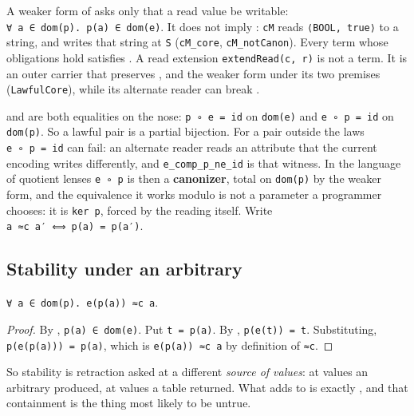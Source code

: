 A weaker form of  asks only that a read value be writable:
\texttt{∀\ a\ ∈\ dom(p).\ p(a)\ ∈\ dom(e)}. It does not imply : \texttt{cM} reads \texttt{⟨BOOL,\ true⟩}
to a string, and writes that string at \texttt{S} (\texttt{cM\_core}, \texttt{cM\_notCanon}). Every term whose obligations hold
satisfies . A read extension \texttt{extendRead(c,\ r)} is not a term. It is an outer carrier that
preserves ,  and the weaker form under its two premises
(\texttt{LawfulCore}), while its alternate reader can break .

 and  are both equalities on the nose: \texttt{p\ ∘\ e\ =\ id} on
\texttt{dom(e)} and \texttt{e\ ∘\ p\ =\ id} on \texttt{dom(p)}. So a lawful pair is a partial bijection. For a pair
outside the laws \texttt{e\ ∘\ p\ =\ id} can fail: an alternate reader reads an attribute that the current
encoding writes differently, and \texttt{e\_comp\_p\_ne\_id} is that witness. In the language of quotient
lenses \cite{quotient-lenses} \texttt{e\ ∘\ p} is then a \textbf{canonizer}, total on \texttt{dom(p)} by the
weaker form, and the equivalence it works modulo is not a parameter a programmer chooses: it is
\texttt{ker\ p}, forced by the reading itself. Write \texttt{a\ ≈c\ a′\ ⟺\ p(a)\ =\ p(a′)}.

\subsection{Stability under an arbitrary}\label{corollary-q--stability}

\begin{corollary}[Q — stability]
\label{cor:Q}
\leanok
\texttt{∀\ a\ ∈\ dom(p).\ e(p(a))\ ≈c\ a}.
\end{corollary}

\begin{proof}
\leanok
By , \texttt{p(a)\ ∈\ dom(e)}. Put \texttt{t\ =\ p(a)}. By , \texttt{p(e(t))\ =\ t}. Substituting,
\texttt{p(e(p(a)))\ =\ p(a)}, which is \texttt{e(p(a))\ ≈c\ a} by definition of \texttt{≈c}.
\end{proof}

So stability is retraction asked at a different \emph{source of values}:  at values an arbitrary
produced,  at values a table returned. What  adds to
 is exactly , and that containment is the thing most likely to be untrue.

